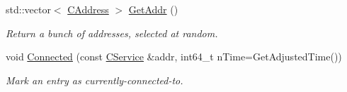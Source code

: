 \begin{DoxyCompactItemize}
\mbox{\label{class_c_addr_man_a69cc6138e696cf88de60925d26023bf2}} 
std\+::vector$<$ \mbox{\hyperlink{class_c_address}{C\+Address}} $>$ \mbox{\hyperlink{class_c_addr_man_a69cc6138e696cf88de60925d26023bf2}{Get\+Addr}} ()
\begin{DoxyCompactList}\small\item\em Return a bunch of addresses, selected at random. \end{DoxyCompactList}\item 
\mbox{\label{class_c_addr_man_a7aba66d9e9527522fed974567d34c322}} 
void \mbox{\hyperlink{class_c_addr_man_a7aba66d9e9527522fed974567d34c322}{Connected}} (const \mbox{\hyperlink{class_c_service}{C\+Service}} \&addr, int64\+\_\+t n\+Time=Get\+Adjusted\+Time())
\begin{DoxyCompactList}\small\item\em Mark an entry as currently-\/connected-\/to. \end{DoxyCompactList}\end{DoxyCompactItemize}

